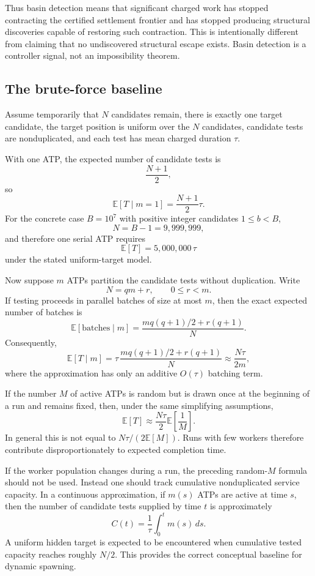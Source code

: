 \documentclass[11pt]{article}
\theoremstyle{definition}
\begin{document}
Thus basin detection means that significant charged work has stopped contracting the certified settlement frontier and has stopped producing structural discoveries capable of restoring such contraction. This is intentionally different from claiming that no undiscovered structural escape exists. Basin detection is a controller signal, not an impossibility theorem.

\subsection{The brute-force baseline}

Assume temporarily that $N$ candidates remain, there is exactly one target candidate, the target position is uniform over the $N$ candidates, candidate tests are nonduplicated, and each test has mean charged duration $\tau$.

With one ATP, the expected number of candidate tests is
\[
\frac{N+1}{2},
\]
so
\[
\boxed{
\mathbb E[T\mid m=1]
=
\frac{N+1}{2}\tau.
}
\]
For the concrete case $B=10^7$ with positive integer candidates $1\le b<B$,
\[
N=B-1=9{,}999{,}999,
\]
and therefore one serial ATP requires
\[
\boxed{
\mathbb E[T]=5{,}000{,}000\,\tau
}
\]
under the stated uniform-target model.

Now suppose $m$ ATPs partition the candidate tests without duplication. Write
\[
N=qm+r,
\qquad 0\le r<m.
\]
If testing proceeds in parallel batches of size at most $m$, then the exact expected number of batches is
\[
\mathbb E[\text{batches}\mid m]
=
\frac{
 m q(q+1)/2+r(q+1)
}{N}.
\]
Consequently,
\[
\boxed{
\mathbb E[T\mid m]
=
\tau\,
\frac{m q(q+1)/2+r(q+1)}{N}
\approx
\frac{N\tau}{2m},
}
\]
where the approximation has only an additive $O(\tau)$ batching term.

If the number $M$ of active ATPs is random but is drawn once at the beginning of a run and remains fixed, then, under the same simplifying assumptions,
\[
\boxed{
\mathbb E[T]
\approx
\frac{N\tau}{2}
\mathbb E\!\left[\frac{1}{M}\right].
}
\]
In general this is not equal to $N\tau/(2\mathbb E[M])$. Runs with few workers therefore contribute disproportionately to expected completion time.

If the worker population changes during a run, the preceding random-$M$ formula should not be used. Instead one should track cumulative nonduplicated service capacity. In a continuous approximation, if $m(s)$ ATPs are active at time $s$, then the number of candidate tests supplied by time $t$ is approximately
\[
C(t)=\frac{1}{\tau}\int_0^t m(s)\,ds.
\]
A uniform hidden target is expected to be encountered when cumulative tested capacity reaches roughly $N/2$. This provides the correct conceptual baseline for dynamic spawning.
\end{document}
